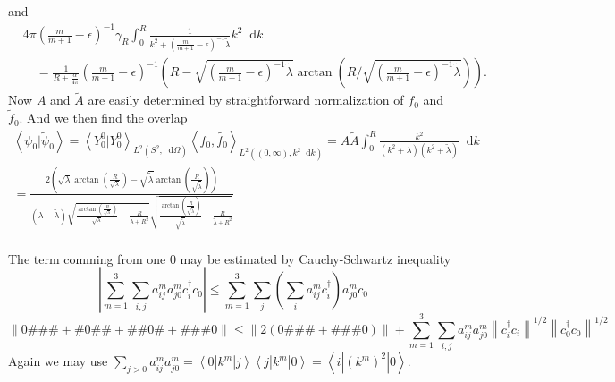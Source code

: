 \documentclass[a4paper,11pt]{article}
\newcommand{\norm}[1]{\left\lVert #1 \right\rVert}
\newcommand{\abs}[1]{\left\lvert #1 \right\rvert}
\renewcommand{\braket}[1]{\left\langle#1\right\rangle}
\newcommand*\diff{\mathop{}\!\mathrm{d}}
\numberwithin{equation}{section}
\begin{document}
and
\begin{equation}
\begin{aligned}
&4\pi\left(\frac{m}{m+1}-\epsilon\right)^{-1}\gamma_R\int_{0}^{R}\frac{1}{k^2+\left(\frac{m}{m+1}-\epsilon\right)^{-1}\tilde{\lambda}} k^2\diff k \\&\quad=\frac{1}{R+\frac{\alpha}{4\pi}}\left(\frac{m}{m+1}-\epsilon\right)^{-1}\left(R-\sqrt{\left(\frac{m}{m+1}-\epsilon\right)^{-1}\tilde{\lambda}}\arctan\left(R\Bigg/\sqrt{\left(\frac{m}{m+1}-\epsilon\right)^{-1}\tilde{\lambda}}\right)\right).
\end{aligned}
\end{equation}
Now $ A $ and $ \tilde{A} $ are easily determined by straightforward normalization of $ f_0 $ and $ \tilde{f}_0 $. And we then find the overlap \begin{equation}
\begin{aligned}
\braket{\psi_0|\tilde{\psi}_0}=\braket{Y_0^0|Y_0^0}_{L^2(S^2,\diff\Omega)}\braket{f_0,\tilde{f_0}}_{L^2((0,\infty),k^2\diff k)}=A\tilde{A}\int_{0}^{R}\frac{k^2}{(k^2+\lambda)(k^2+\tilde{\lambda})}\diff k\\
=\frac{2 \left(\sqrt{\lambda } \arctan\left(\frac{R}{\sqrt{\lambda }}\right)-\sqrt{\tilde{\lambda}
	} \arctan\left(\frac{R}{\sqrt{\tilde{\lambda} }}\right)\right)}{(\lambda -\tilde{\lambda} )
	\sqrt{\frac{\arctan\left(\frac{R}{\sqrt{\lambda }}\right)}{\sqrt{\lambda
			}}-\frac{R}{\lambda +R^2}} \sqrt{\frac{\arctan\left(\frac{R}{\sqrt{\tilde{\lambda}
			}}\right)}{\sqrt{\tilde{\lambda} }}-\frac{R}{\tilde{\lambda} +R^2}}}
\end{aligned}
\end{equation}
\\
The term comming from one $ 0 $ may be estimated by Cauchy-Schwartz inequality
\begin{equation}
\abs{\sum_{m=1}^{3}\sum_{i,j}a^m_{ij}a^m_{j0}c_i^\dagger  c_0}\leq \sum_{m=1}^{3}\sum_{j}\left(\sum_{i}a^m_{ij}c_i^\dagger\right) a^m_{j0}  c_0
\end{equation}
\begin{equation}
\norm{0\#\#\#+\#0\#\#+\#\#0\#+\#\#\#0}\leq\norm{2(0\#\#\#+\#\#\#0)}+\sum_{m=1}^{3}\sum_{i,j}a^m_{ij}a^m_{j0}\norm{c_i^\dagger c_i}^{1/2}\norm{c_0^\dagger c_0}^{1/2}
\end{equation}
Again we may use $ \sum_{j>0} a^m_{ij}a^m_{j0}=\braket{0|k^m|j}\braket{j|k^m|0}=\braket{i|(k^m)^2|0} $.
	\appendix
\end{document}
